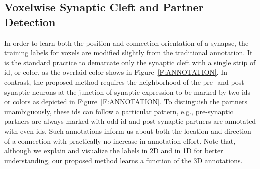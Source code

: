 \documentclass{llncs}
\begin{document}
\subsection{Voxelwise Synaptic Cleft and Partner Detection}\label{S:PIXEL}
In order to learn both the position and connection orientation of a synapse, the training labels for voxels are modified slightly from the traditional annotation. It is the standard practice to demarcate only the synaptic cleft with a single strip of id, or color, as the overlaid color shows in Figure~\ref{F:ANNOTATION}. In contrast, the proposed method requires the neighborhood of the pre- and post-synaptic neurons at the junction of synaptic expression to be marked by two ids or colors as depicted in Figure~\ref{F:ANNOTATION}. To distinguish the partners unambiguously, these ids can follow a particular pattern, e.g., pre-synaptic partners are always marked with odd id and post-synaptic partners are annotated with even ids. Such annotations inform us about both the location and direction of a connection with practically no increase in annotation effort. Note that, although we explain and visualize the labels in 2D and in 1D for better understanding, our proposed method learns a function of the 3D annotations.   
\end{document}
